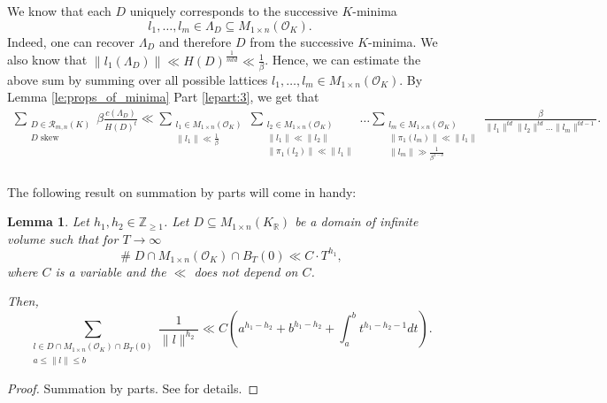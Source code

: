 \documentclass{amsart}
\newtheorem{lemma}[theorem]{Lemma}
\newcommand{\OK}{\mathcal{O}_K}
\DeclareMathOperator{\card}{\texttt{\#}}
\begin{document}
We know that each $D$ uniquely corresponds to the successive $K$-minima 
$$l_1,\dots,l_m \in \Lambda_D \subseteq M_{1\times n}(\OK).$$
Indeed, one can recover $\Lambda_D$ and therefore $D$ from the successive $K$-minima. We also know that $\|l_1(\Lambda_D)\| \ll H(D)^{\frac{1}{mtd}} \ll \tfrac{1}{\beta}$. Hence, we can estimate the above sum
by summing over all possible
lattices $l_1,\dots,l_m \in M_{1 \times n}(\OK)$.
By Lemma \ref{le:props_of_minima} Part \ref{lepart:3}, we get that 
{\small\begin{align}
	\sum_{\substack{D \in \mathcal{R}_{m,n}(K) \\  D \text{ skew} }}
\beta	\frac{  c(\Lambda_D) }{ H(D)^{t} } \ll 
	\sum_{ \substack{l_1 \in M_{1 \times n}(\OK) \\ \|l_1\| \ll \tfrac{1}{\beta}   }}  
	\sum_{ \substack{l_2 \in M_{1 \times n}(\OK) \\ \|l_1\| \ll \|l_2\|  \\ \|\pi_{1}(l_2)\| \ll \|l_1\|   }}  
	\dots
	\sum_{ \substack{l_m \in M_{1 \times n}(\OK)   \\ \|\pi_1(l_m)\| \ll \|l_1\| \\ \|l_m\| \gg \frac{1}{\beta^{1-\delta}} }}  
	\frac{\beta}{\|l_1\|^{td} \|l_2\|^{td} \dots \|l_m\|^{td-1} }. \\
\end{align}}

The following result on summation by parts will come in handy: 
\begin{lemma}
\label{le:domain_dimension_bound}
Let $h_1,h_2 \in \mathbb{Z}_{\geq 1}$. 
Let $D \subseteq M_{1 \times n}(K_\mathbb{R})$ be a domain of infinite volume such that for $T \rightarrow \infty$
\begin{equation}
  \card D \cap M_{1 \times n}(\OK) \cap B_{T}(0) \ll C \cdot T^{h_1},
\end{equation}
where $C$ is a variable and the $\ll$ does not depend on $C$.

Then, 
\begin{equation}
  \sum_{\substack{ l \in  D \cap M_{1 \times n}(\OK) \cap B_{T}(0) \\ a \leq \|l\| \leq b}} \frac{1}{\|l\|^{h_2}} \ll C \left( a^{h_1-h_2} + b^{h_1-h_2} + \int_{a}^{b} t^{h_1 - h_2 -1} dt \right).
\end{equation}
\end{lemma}
\begin{proof}
Summation by parts. See \cite[(13)]{K1994} for details. 
\end{proof}
\end{document}
